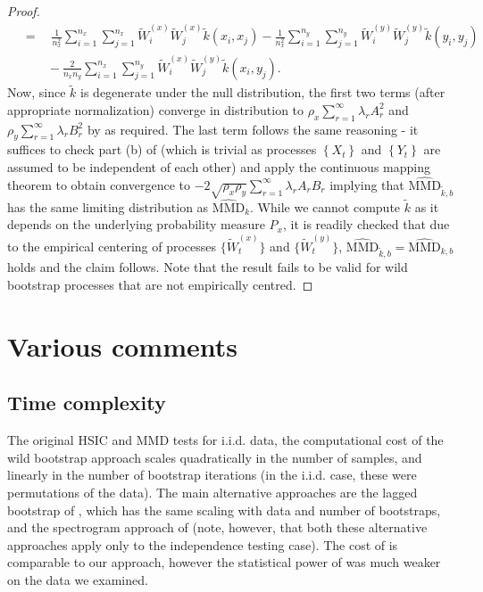 \documentclass{article} %
\begin{document}
\begin{proof}
\begin{align*}
{}&=\quad\frac{1}{n_x^2}\sum_{i=1}^{n_x}\sum_{j=1}^{n_x}\tilde W_i^{(x)}\tilde W_j^{(x)}\tilde k(x_i,x_j)-\frac{1}{n_x^2}\sum_{i=1}^{n_y}\sum_{j=1}^{n_y}\tilde W_i^{(y)}\tilde W_j^{(y)}\tilde k(y_i,y_j)\\
{}&\qquad-\frac{2}{n_x n_y}\sum_{i=1}^{n_x}\sum_{j=1}^{n_y}\tilde W_i^{(x)}\tilde W_j^{(y)}\tilde k(x_i,y_j). 
\end{align*}
Now, since $\tilde k$ is degenerate under the null distribution, the first two terms (after appropriate normalization) converge in distribution to $\rho_x\sum_{r=1}^\infty \lambda_r A_r^2$ and  $\rho_y\sum_{r=1}^\infty \lambda_r B_r^2$ by \cite[Theorem 3.1]{leucht_dependent_2013} as required. 
The last term follows the same reasoning - it suffices to check part (b) of \cite[Theorem 3.1]{leucht_dependent_2013} (which is trivial as processes $\left\{ X_t \right\}$ and $\left\{ Y_t \right\}$ are assumed to be independent of each other) and apply the continuous mapping theorem to obtain convergence to $-2\sqrt{\rho_x\rho_y}\sum_{r=1}^\infty \lambda_r A_rB_r$ implying that $\widehat{\text{MMD}}_{\tilde k, b}$ has the same limiting distribution as $\widehat{\text{MMD}}_{k}$.
While we cannot compute $\tilde k$ as it depends on the underlying probability measure $P_x$, it is readily checked that due to the empirical centering of processes $\{\tilde W_t^{(x)}\}$ and $\{\tilde W_t^{(y)}\}$, $\widehat{\text{MMD}}_{\tilde k, b}=\widehat{\text{MMD}}_{k, b}$ holds and the claim follows. Note that the result fails to be valid for wild bootstrap processes that are not empirically centred.
\end{proof}


\section{Various comments}

\subsection{Time complexity}
The original HSIC and MMD tests for i.i.d. data, the computational cost of the wild bootstrap approach scales quadratically in the number of samples, and linearly in the number of bootstrap iterations (in the i.i.d. case, these were permutations of the data). The main alternative approaches are the lagged bootstrap of \cite{chwialkowski2014kernel}, which has the same scaling with data and number of bootstraps, and the spectrogram approach of \cite{besserve_statistical_2013} (note, however, that both these alternative approaches apply only to the independence testing case). The cost of \cite{besserve_statistical_2013} is comparable to our approach, however the statistical power of \cite{besserve_statistical_2013} was much weaker on the data we examined.

  
%
%
\end{document}

